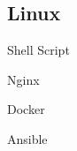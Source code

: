 \documentclass[]{deedy-resume-openfont}
\begin{document}
\begin{minipage}[t]{0.5\textwidth}
\begin{minipage}[t]{0.45\textwidth}
    \subsection{Linux}
    \vspace{\topsep}
    \begin{tightemize}
        \item Shell Script
        \item Nginx
        \item Docker
        \item Ansible
    \end{tightemize}
\end{minipage}





%


\end{minipage}
\end{document}
